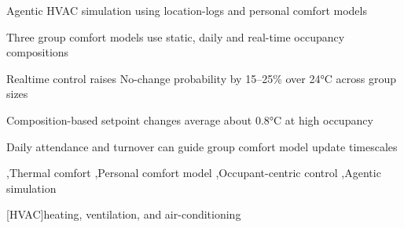 \documentclass[a4paper,fleqn]{cas-sc}
\begin{document}
\begin{highlights}
\item Agentic HVAC simulation using location-logs and personal comfort models
\item Three group comfort models use static, daily and real-time occupancy compositions
\item Realtime control raises No-change probability by 15--25\% over 24°C across group sizes
\item Composition-based setpoint changes average about 0.8°C at high occupancy
\item Daily attendance and turnover can guide group comfort model update timescales

\end{highlights}




\begin{keywords}
\sep Thermal comfort
\sep Personal comfort model
\sep Occupant-centric control
\sep Agentic simulation
\end{keywords}

\maketitle

[HVAC]{heating, ventilation, and air-conditioning}
\end{document}
